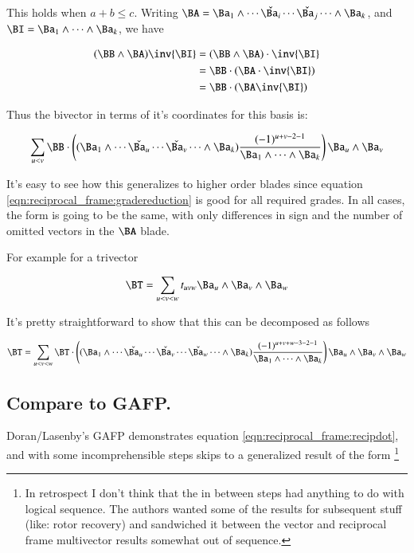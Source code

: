 This holds when $a + b \le c$.  Writing 
$\BA = \Ba_1 \wedge \cdots \check{\Ba_i} \cdots \check{\Ba_j} \cdots \wedge \Ba_k$, and
$\BI = \Ba_1 \wedge \cdots \wedge \Ba_k$, we have

\begin{align*}
(\BB \wedge \BA) \inv{\BI}
&= (\BB \wedge \BA) \cdot \inv{\BI} \\
&= \BB \cdot (\BA \cdot \inv{\BI}) \\
&= \BB \cdot (\BA \inv{\BI}) \\
\end{align*}

Thus the bivector in terms of it's coordinates for this basis is:

\begin{equation}\label{eqn:reciprocal_frame:bivectordecomp}
\sum_{u<v} 
\BB \cdot
\left(
(\Ba_1 \wedge \cdots \check{\Ba_u} \cdots \check{\Ba_v} \cdots \wedge \Ba_k)
\frac{(-1)^{u+v-2-1}}
{\Ba_1 \wedge \cdots \wedge \Ba_k}
\right)
\Ba_u \wedge \Ba_v
\end{equation}

It's easy to see how this generalizes to higher order blades since 
equation \ref{eqn:reciprocal_frame:gradereduction} is good for all required grades.  In all cases, the form is going to be the same, with only differences
in sign and the number of omitted vectors in the $\BA$ blade.

For example for a trivector

\[
\BT = \sum_{u<v<w}t_{uvw} \Ba_u \wedge \Ba_v \wedge \Ba_w
\]

It's pretty straightforward to show that this can be decomposed as follows

\begin{equation}\label{eqn:reciprocal_frame:trivectordecomp}
\BT = \sum_{u<v<w} \BT \cdot
\left(
(\Ba_1 \wedge \cdots \check{\Ba_u} \cdots \check{\Ba_v} \cdots \check{\Ba_w} \cdots \wedge \Ba_k)
\frac{(-1)^{u+v+w-3-2-1}}
{\Ba_1 \wedge \cdots \wedge \Ba_k}
\right)
\Ba_u \wedge \Ba_v \wedge \Ba_w
\end{equation}

\subsection{Compare to GAFP. }

Doran/Lasenby's GAFP 
demonstrates equation \ref{eqn:reciprocal_frame:recipdot}, and with some incomprehensible steps skips to a generalized
result of the form
\footnote{ In retrospect I don't think that the in between steps had anything to do with logical sequence.  The authors wanted some of the results for subsequent stuff (like: rotor recovery) and sandwiched it between the vector and reciprocal frame multivector results somewhat out of sequence.}

